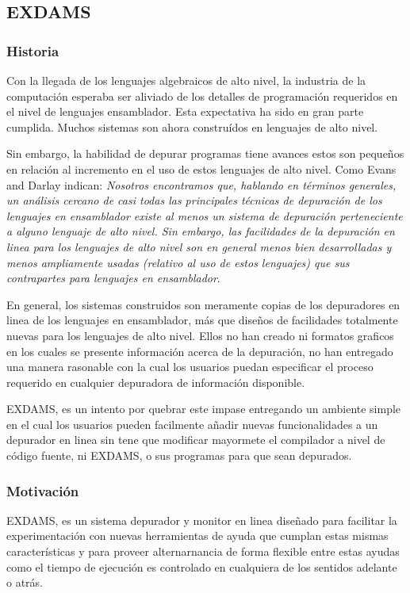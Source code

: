 \documentclass[12pt,legalpaper]{report}
\begin{document}
		\subsection{EXDAMS}
			\subsubsection{Historia}

Con la llegada de los lenguajes algebraicos de alto nivel, la industria de la computación esperaba ser aliviado de los detalles de programación requeridos en el nivel de lenguajes ensamblador.  Esta expectativa ha sido en gran parte cumplida.  Muchos sistemas son ahora construídos en lenguajes de alto nivel.

Sin embargo, la habilidad de depurar programas tiene avances estos son pequeños en relación al incremento en el uso de estos lenguajes de alto nivel.  Como Evans and Darlay indican:
\textit{ Nosotros encontramos que, hablando en términos generales, un análisis cercano de casi todas las principales técnicas de depuración de los lenguajes en ensamblador existe al menos un sistema de depuración perteneciente a alguno lenguaje de alto nivel.  Sin embargo, las facilidades de la depuración en linea para los lenguajes de alto nivel son en general menos bien desarrolladas y menos ampliamente usadas (relativo al uso de estos lenguajes) que sus contrapartes para lenguajes en ensamblador}.

En general, los sistemas construidos son meramente copias de los depuradores en linea de los lenguajes en ensamblador, más que diseños de facilidades totalmente nuevas para los lenguajes de alto nivel.  Ellos no han creado ni formatos graficos en los cuales se presente información acerca de la depuración, no han entregado una manera rasonable con la cual los usuarios puedan especificar el proceso requerido en cualquier depuradora de información disponible.

EXDAMS, es un intento por quebrar este impase entregando un ambiente simple en el cual los usuarios pueden facilmente añadir nuevas funcionalidades a un depurador en linea sin tene que modificar mayormete el compilador a nivel de código fuente, ni EXDAMS, o sus programas para que sean depurados.


			\subsubsection{Motivación}

EXDAMS, es un sistema depurador y monitor en linea diseñado para facilitar la experimentación con nuevas herramientas de ayuda que cumplan estas mismas características y para proveer alternarnancia de forma flexible entre estas ayudas como el tiempo de ejecución es controlado en cualquiera de los sentidos adelante o atrás.
\end{document}
